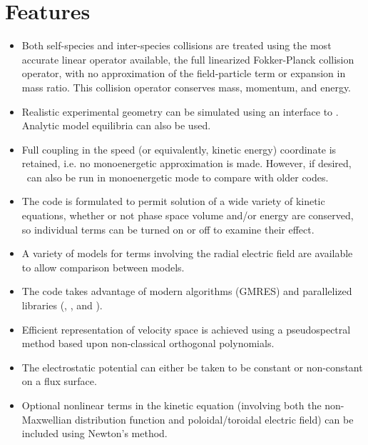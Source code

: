 \section{Features}

\begin{itemize}

\item
Both self-species and inter-species collisions are treated using the most accurate linear operator available, the full linearized Fokker-Planck collision operator,
with no approximation of the field-particle term or expansion in mass ratio.  This collision operator conserves mass, momentum, and energy.

\item
Realistic experimental geometry can be simulated using an interface to \vmec.  Analytic model equilibria can also be used.

\item
Full coupling in the speed (or equivalently, kinetic energy) coordinate is retained, i.e. no monoenergetic approximation is made.  However,
if desired, \sfincs~can also be run in monoenergetic mode to compare with older codes.

\item
The code is formulated to permit solution of a wide variety of kinetic equations, whether or not phase space volume and/or energy are conserved, so individual terms can be turned on or off to examine their effect. 

\item
A variety of models for terms involving the radial electric field are available to allow comparison between models. 

\item
The code takes advantage of modern algorithms (GMRES) and parallelized libraries (\PETSc, \superludist, and \mumps).

\item
Efficient representation of velocity space is achieved using a pseudospectral method based upon non-classical orthogonal polynomials. \cite{speedGrids}

\item
The electrostatic potential can either be taken to be constant or non-constant on a flux surface.

\item
Optional nonlinear terms in the kinetic equation (involving both the non-Maxwellian distribution function and poloidal/toroidal electric field) can be included using Newton's method. 

\end{itemize}

